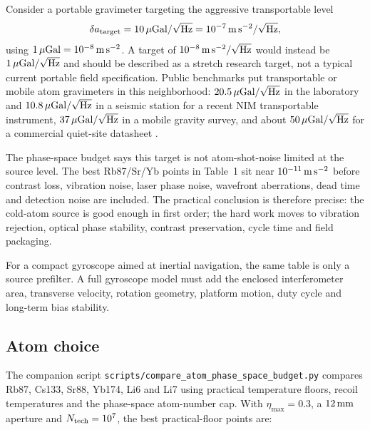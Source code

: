\documentclass[11pt,a4paper]{article}
\begin{document}
Consider a portable gravimeter targeting the aggressive transportable level
\begin{equation}
\delta a_{\rm target}=10\,\mu{\rm Gal}/\sqrt{\rm Hz}
=10^{-7}\,{\rm m\,s^{-2}/\sqrt{Hz}},
\end{equation}
using $1\,\mu{\rm Gal}=10^{-8}\,{\rm m\,s^{-2}}$. A target of
$10^{-8}\,{\rm m\,s^{-2}/\sqrt{Hz}}$ would instead be
$1\,\mu{\rm Gal}/\sqrt{\rm Hz}$ and should be described as a stretch research
target, not a typical current portable field specification.
Public benchmarks put transportable or mobile atom gravimeters in this
neighborhood: $20.5\,\mu{\rm Gal}/\sqrt{\rm Hz}$ in the laboratory and
$10.8\,\mu{\rm Gal}/\sqrt{\rm Hz}$ in a seismic station for a recent NIM
transportable instrument, $37\,\mu{\rm Gal}/\sqrt{\rm Hz}$ in a mobile gravity
survey, and about $50\,\mu{\rm Gal}/\sqrt{\rm Hz}$ for a commercial quiet-site
datasheet \cite{nim-transportable, mobile-gravity-survey, muquans-aqg}.

The phase-space budget says this target is not atom-shot-noise limited at the
source level. The best Rb87/Sr/Yb points in Table~1 sit near
$10^{-11}\,{\rm m\,s^{-2}}$ before contrast loss, vibration noise, laser phase
noise, wavefront aberrations, dead time and detection noise are included. The
practical conclusion is therefore precise: the cold-atom source is good enough
in first order; the hard work moves to vibration rejection, optical phase
stability, contrast preservation, cycle time and field packaging.

For a compact gyroscope aimed at inertial navigation, the same table is only a
source prefilter. A full gyroscope model must add the enclosed interferometer
area, transverse velocity, rotation geometry, platform motion, duty cycle and
long-term bias stability.

\subsection{Atom choice}

The companion script \texttt{scripts/compare\_atom\_phase\_space\_budget.py}
compares Rb87, Cs133, Sr88, Yb174, Li6 and Li7 using practical temperature
floors, recoil temperatures and the phase-space atom-number cap. With
$\eta_{\max}=0.3$, a $12\,{\rm mm}$ aperture and $N_{\rm tech}=10^7$, the
best practical-floor points are:
\end{document}
